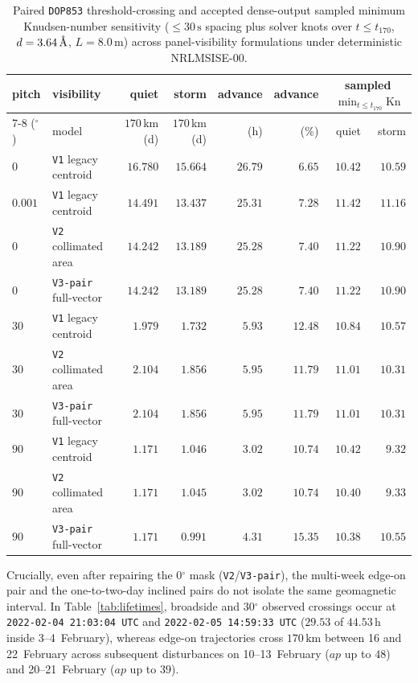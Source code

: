 \documentclass[12pt]{article}
\newcommand{\unit}[1]{\,\mathrm{#1}}
\newcommand{\degree}{\ensuremath{{}^\circ}}
\begin{document}
\begin{table}[htbp]
\centering
\footnotesize
\setlength{\tabcolsep}{4.5pt}
\caption{Paired \texttt{DOP853} threshold-crossing and accepted dense-output sampled minimum Knudsen-number sensitivity ($\le 30\unit{s}$ spacing plus solver knots over $t \le t_{170}$, $d=3.64\,\text{\normalfont\AA}$, $L=8.0\unit{m}$) across panel-visibility formulations under deterministic NRLMSISE-00.}
\label{tab:visibility-orbital}
\begin{tabular}{llrrrrrr}
\toprule
pitch & visibility & quiet & storm & advance & advance & \multicolumn{2}{c}{sampled $\min_{t\le t_{170}}\mathrm{Kn}$} \\
\cmidrule(lr){7-8}
($\degree$) & model & $170\,$km (d) & $170\,$km (d) & (h) & (\%) & quiet & storm \\
\midrule
$0$ & \texttt{V1} legacy centroid & $16.780$ & $15.664$ & $26.79$ & $6.65$ & $10.42$ & $10.59$ \\
$0.001$ & \texttt{V1} legacy centroid & $14.491$ & $13.437$ & $25.31$ & $7.28$ & $11.42$ & $11.16$ \\
$0$ & \texttt{V2} collimated area & $14.242$ & $13.189$ & $25.28$ & $7.40$ & $11.22$ & $10.90$ \\
$0$ & \texttt{V3-pair} full-vector & $14.242$ & $13.189$ & $25.28$ & $7.40$ & $11.22$ & $10.90$ \\
$30$ & \texttt{V1} legacy centroid & $1.979$ & $1.732$ & $5.93$ & $12.48$ & $10.84$ & $10.57$ \\
$30$ & \texttt{V2} collimated area & $2.104$ & $1.856$ & $5.95$ & $11.79$ & $11.01$ & $10.31$ \\
$30$ & \texttt{V3-pair} full-vector & $2.104$ & $1.856$ & $5.95$ & $11.79$ & $11.01$ & $10.31$ \\
$90$ & \texttt{V1} legacy centroid & $1.171$ & $1.046$ & $3.02$ & $10.74$ & $10.42$ & $9.32$ \\
$90$ & \texttt{V2} collimated area & $1.171$ & $1.045$ & $3.02$ & $10.74$ & $10.40$ & $9.33$ \\
$90$ & \texttt{V3-pair} full-vector & $1.171$ & $0.991$ & $4.31$ & $15.35$ & $10.38$ & $10.55$ \\
\bottomrule
\end{tabular}
\end{table}

Crucially, even after repairing the $0\degree$ mask (\texttt{V2}/\texttt{V3-pair}), the multi-week edge-on pair and the one-to-two-day inclined pairs do not isolate the same geomagnetic interval. In Table~\ref{tab:lifetimes}, broadside and $30\degree$ observed crossings occur at \texttt{2022-02-04 21:03:04 UTC} and \texttt{2022-02-05 14:59:33 UTC} ($29.53$ of $44.53\unit{h}$ inside 3--4~February), whereas edge-on trajectories cross $170\unit{km}$ between 16 and 22~February across subsequent disturbances on 10--13~February ($ap$ up to $48$) and 20--21~February ($ap$ up to $39$).
\end{document}
